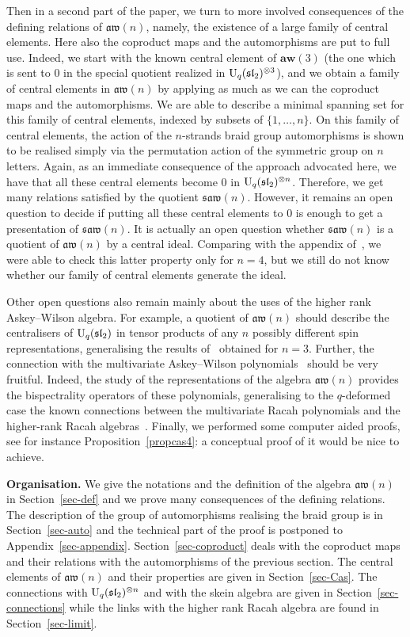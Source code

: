 \documentclass[pdftex]{sigma}
\numberwithin{equation}{section}
\theoremstyle{definition}
\newcommand{\aw}{\mathfrak{aw}(n)}
\newcommand{\saw}{\mathfrak{saw}(n)}
\begin{document}
Then in a second part of the paper, we turn to more involved consequences of the defining relations of $\aw$, namely, the existence of a large family of central elements.
Here also the coproduct maps and the automorphisms are put to full use. Indeed, we start with the known central element of $\textbf{aw}(3)$ \big(the one which is sent to $0$ in the special quotient realized in ${\rm U}_q(\mathfrak{sl}_2)^{\otimes 3}$\big),
and we obtain a family of central elements in $\aw$ by applying as much as we can the coproduct maps and the automorphisms. We are able to describe a minimal spanning set for this family of central elements,
indexed by subsets of $\{1,\dots,n\}$. On this family of central elements, the action of the $n$-strands braid group automorphisms is shown to be realised simply via the permutation action of the symmetric group on $n$ letters.
Again, as an immediate consequence of the approach advocated here, we have that all these central elements become $0$ in ${\rm U}_q(\mathfrak{sl}_2)^{\otimes n}$.
Therefore, we get many relations satisfied by the quotient $\saw$. However, it remains an open question to decide if putting all these central elements to 0 is enough to get a presentation of $\saw$.
It is actually an open question whether $\saw$ is a quotient of $\aw$ by a central ideal. Comparing with the appendix of~\cite{CL}, we were able to check this latter property only for $n=4$, but we still do not know whether our family of central elements generate the ideal.

Other open questions also remain mainly about the uses of the higher rank Askey--Wilson algebra. For example, a quotient of $\aw$ should describe the centralisers of ${\rm U}_q(\mathfrak{sl}_2)$
in tensor products of any $n$ possibly different spin representations, generalising the results of~\cite{CPVZ, CVZ2} obtained for $n=3$.
Further, the connection with the multivariate Askey--Wilson polynomials~\cite{GI2,G, Ili} should be very fruitful. Indeed, the
study of the representations of the algebra $\aw$ provides the bispectrality operators of these polynomials,
generalising to the $q$-deformed case the known connections between the multivariate Racah polynomials and the higher-rank Racah algebras~\cite{CFR}. Finally, we performed some computer aided proofs, see for instance Proposition~\ref{propcas4}: a conceptual proof of it would be nice to achieve.



{\bf Organisation.} We give the notations and the definition of the algebra $\aw$ in Section~\ref{sec-def} and we prove many consequences of the defining relations.
The description of the group of automorphisms realising the braid group is in Section~\ref{sec-auto} and the technical part of the proof is postponed to Appendix~\ref{sec-appendix}.
Section~\ref{sec-coproduct} deals with the coproduct maps and their relations with the automorphisms of the previous section.
The central elements of $\aw$ and their properties are given in Section~\ref{sec-Cas}. The connections with ${\rm U}_q(\mathfrak{sl}_2)^{\otimes n}$ and with the skein algebra are given in Section~\ref{sec-connections} while
the links with the higher rank Racah algebra are found in Section~\ref{sec-limit}.
\end{document}
